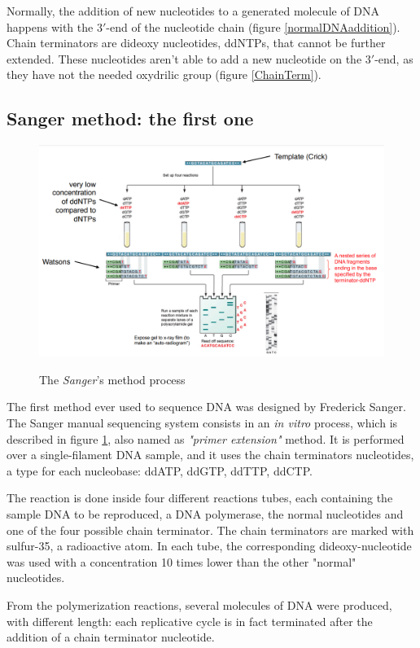 Normally, the addition of new nucleotides to a generated molecule of DNA happens with the $3'$-end of the nucleotide chain (figure \ref{normalDNAaddition}). Chain terminators are dideoxy nucleotides, ddNTPs, that cannot be further extended. These nucleotides aren't able to add a new nucleotide on the $3'$-end, as they have not the needed oxydrilic group (figure \ref{ChainTerm}). 

\subsection{Sanger method: the first one}

\begin{figure}[h]
\caption{The \textit{Sanger}'s method process}
\centering
\includegraphics[width=\textwidth]{Sanger}
\label{Sanger}
\end{figure}

The first method ever used to sequence DNA was designed by Frederick Sanger. The Sanger manual sequencing system consists in an \textit{in vitro} process, which is described in figure \ref{Sanger}, also named as \textit{"primer extension"} method. It is performed over a single-filament DNA sample, and it uses the chain terminators nucleotides, a type for each nucleobase: ddATP, ddGTP, ddTTP, ddCTP. 

The reaction is done inside four different reactions tubes, each containing the sample DNA to be reproduced, a DNA polymerase, the normal nucleotides and one of the four possible chain terminator. The chain terminators are marked with sulfur-35, a radioactive atom. In each tube, the corresponding dideoxy-nucleotide was used with a concentration 10 times lower than the other "normal" nucleotides.

From the polymerization reactions, several molecules of DNA were produced, with different length: each replicative cycle is in fact terminated after the addition of a chain terminator nucleotide.

